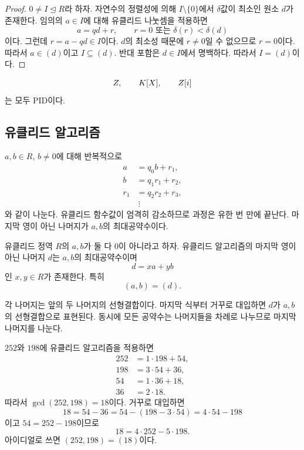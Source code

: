 \begin{proof}
$0\ne I\trianglelefteq R$라 하자. 자연수의 정렬성에 의해 $I\setminus\{0\}$에서 $\delta$값이 최소인 원소 $d$가 존재한다. 임의의 $a\in I$에 대해 유클리드 나눗셈을 적용하면
\[
  a=qd+r,\qquad r=0\text{ 또는 }\delta(r)<\delta(d)
\]
이다. 그런데 $r=a-qd\in I$이다. $d$의 최소성 때문에 $r\ne0$일 수 없으므로 $r=0$이다. 따라서 $a\in(d)$이고 $I\subseteq(d)$. 반대 포함은 $d\in I$에서 명백하다. 따라서 $I=(d)$이다.
\end{proof}

\begin{corollary}
\[
  Z,\qquad K[X],\qquad Z[i]
\]
는 모두 PID이다.
\end{corollary}

\subsection{유클리드 알고리즘}

$a,b\in R$, $b\ne0$에 대해 반복적으로
\[
\begin{aligned}
 a&=q_0b+r_1,\\
 b&=q_1r_1+r_2,\\
 r_1&=q_2r_2+r_3,\\
 &\ \vdots
\end{aligned}
\]
와 같이 나눈다. 유클리드 함수값이 엄격히 감소하므로 과정은 유한 번 만에 끝난다. 마지막 영이 아닌 나머지가 $a,b$의 최대공약수이다.

\begin{theorem}
유클리드 정역 $R$의 $a,b$가 둘 다 $0$이 아니라고 하자. 유클리드 알고리즘의 마지막 영이 아닌 나머지 $d$는 $a,b$의 최대공약수이며
\[
  d=xa+yb
\]
인 $x,y\in R$가 존재한다. 특히
\[
  (a,b)=(d).
\]
\end{theorem}

\begin{proofidea}
각 나머지는 앞의 두 나머지의 선형결합이다. 마지막 식부터 거꾸로 대입하면 $d$가 $a,b$의 선형결합으로 표현된다. 동시에 모든 공약수는 나머지들을 차례로 나누므로 마지막 나머지를 나눈다.
\end{proofidea}

\begin{example}
$252$와 $198$에 유클리드 알고리즘을 적용하면
\[
\begin{aligned}
252&=1\cdot198+54,\\
198&=3\cdot54+36,\\
54&=1\cdot36+18,\\
36&=2\cdot18.
\end{aligned}
\]
따라서 $\gcd(252,198)=18$이다. 거꾸로 대입하면
\[
  18=54-36=54-(198-3\cdot54)=4\cdot54-198
\]
이고 $54=252-198$이므로
\[
  18=4\cdot252-5\cdot198.
\]
아이디얼로 쓰면 $(252,198)=(18)$이다.
\end{example}


